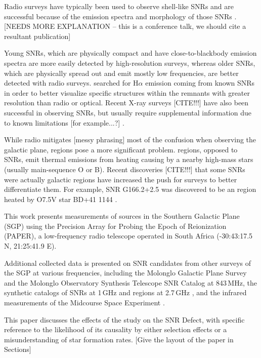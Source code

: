 \documentclass[preprint2,epsf,epsfig,graphics]{emulateapj}
\begin{document}
Radio surveys have typically been used to observe shell-like SNRs and are successful because of the emission spectra and morphology of those SNRs \citep{Bandiera.01}.  {\color{red}[NEEDS MORE EXPLANATION -- this is a conference talk, we should cite a resultant publication]}

Young SNRs, which are physically compact and have close-to-blackbody emission spectra are more easily detected by high-resolution surveys, whereas older SNRs, which are physically spread out and emit mostly low frequencies, are better detected with radio surveys. \cite{Stupar_cat.11} searched for H$\alpha$ emission coming from known SNRs in order to better visualize specific structures within the remnants with greater resolution than radio or optical.  Recent X-ray surveys {\color{red}[CITE!!!]} have also been successful in observing SNRs, but usually require supplemental information due to known limitations {\color{red}[for example...?]} \citep{Bandiera.01}. 

While radio mitigates {\color{red}[messy phrasing]} most of the confusion when observing the galactic plane,  regions pose a more significant problem.   regions, opposed to SNRs, emit thermal emissions from heating causing by a nearby high-mass stars (usually main-sequence O or B).  Recent discoveries {\color{red}[CITE!!!]} that some SNRs were actually galactic  regions have increased the push for surveys to better differentiate them.  For example, SNR G166.2+2.5 was discovered to be an  region heated by O7.5V star BD+41 1144 \citep{Foster.06}.  

This work presents measurements of sources in the Southern Galactic Plane (SGP) using the Precision Array for Probing the Epoch of Reionization (PAPER), a low-frequency radio telescope operated in South Africa (-30:43:17.5 N, 21:25:41.9 E).

Additional collected data is presented on SNR candidates from other surveys of the SGP at various frequencies, including the Molonglo Galactic Plane Survey \citep[MGPS][]{Murphy.07} and the Molonglo Observatory Synthesis Telescope SNR Catalog \citep[MOSTSNRCAT][]{Whiteoak.96} at 843\,MHz, the synthetic catalogs of SNRs at 1\,GHz \citep{DAGreen.14} and  regions at 2.7\,GHz \citep{Paladini.03}, and the infrared measurements of the Midcourse Space Experiment \citep[MSX][operating at 8.28--21.3\,$\mu$m (36.23--14.08\,THz)]{Egan.03}.

This paper discusses the effects of the study on the SNR Defect, with specific reference to the likelihood of its causality by either selection effects or a misunderstanding of star formation rates. {\color{red}[Give the layout of the paper in Sections]}

\clearpage

{}
\end{document}
